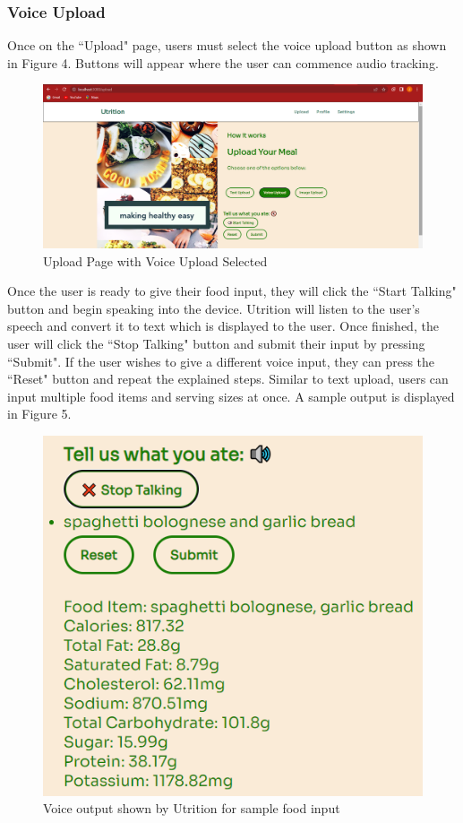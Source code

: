 \documentclass{article}
\begin{document}
\subsubsection{Voice Upload}
Once on the ``Upload" page, users must select the voice upload button as shown in Figure 4. Buttons will appear where the user can commence audio tracking.
\begin{figure}[H]
	\centering
	\includegraphics[scale=0.30]{voiceupload.png}
	\caption{Upload Page with Voice Upload Selected}
\end{figure}
Once the user is ready to give their food input, they will click the ``Start Talking" button and begin speaking into the device. Utrition will listen to the user's speech and convert it to text which is displayed to the user. Once finished, the user will click the ``Stop Talking" button and submit their input by pressing ``Submit". If the user wishes to give a different voice input, they can press the ``Reset" button and repeat the explained steps. Similar to text upload, users can input multiple food items and serving sizes at once. A sample output is displayed in Figure 5.

\begin{figure}[H]
	\centering
	\includegraphics[scale=0.70]{sampleoutputvoice.png}
	\caption{Voice output shown by Utrition for sample food input}
\end{figure}
\end{document}
